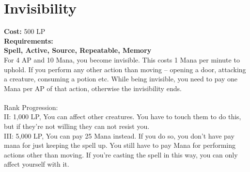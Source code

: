 \section{Invisibility}\label{spell:invisibility}
\textbf{Cost:} 500 LP\\
\textbf{Requirements:}\\
\textbf{Spell, Active, Source, Repeatable, Memory}\\
For 4 AP and 10 Mana, you become invisible.
This costs 1 Mana per minute to uphold.
If you perform any other action than moving -- opening a door, attacking a creature, consuming a potion etc.
While being invisible, you need to pay one Mana per AP of that action, otherwise the invisibility ends.\\
\\
Rank Progression:\\
II: 1,000 LP, You can affect other creatures.
You have to touch them to do this, but if they're not willing they can not resist you.\\

III: 5,000 LP, You can pay 25 Mana instead.
If you do so, you don't have pay mana for just keeping the spell up.
You still have to pay Mana for performing actions other than moving.
If you're casting the spell in this way, you can only affect yourself with it.\\